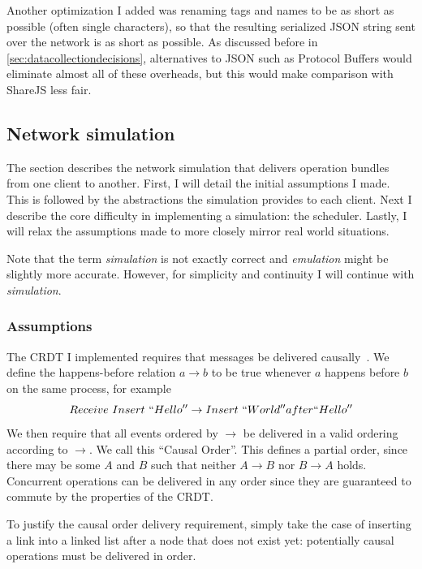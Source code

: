 \documentclass[12pt,a4paper,twoside,openright]{report}
\begin{document}
			Another optimization I added was renaming tags and names to be as short as possible (often single characters), so that the resulting serialized JSON string sent over the network is as short as possible. As discussed before in \cref{sec:datacollectiondecisions}, alternatives to JSON such as Protocol Buffers would eliminate almost all of these overheads, but this would make comparison with ShareJS less fair.
	
	\subsection{Network simulation}

	
		The section describes the network simulation that delivers operation bundles from one client to another. First, I will detail the initial assumptions I made. This is followed by the abstractions the simulation provides to each client. Next I describe the core difficulty in implementing a simulation: the scheduler. Lastly, I will relax the assumptions made to more closely mirror real world situations.
		
		Note that the term \textit{simulation} is not exactly correct and \textit{emulation} might be slightly more accurate. However, for simplicity and continuity I will continue with \textit{simulation}.
		
		\subsubsection{Assumptions} \label{sec:networkassumptions}
		The CRDT I implemented requires that messages be delivered causally~\cite{concdistsystems}. We define the happens-before relation \(a \rightarrow b\) to be true whenever $a$ happens before $b$ on the same process, for example \[Receive\ Insert\ ``Hello'' \rightarrow Insert\ `` World'' after ``Hello''\]
		We then require that all events ordered by $\rightarrow$ be delivered in a valid ordering according to $\rightarrow$. We call this ``Causal Order''. This defines a partial order, since there may be some $A$ and $B$ such that neither $A \rightarrow B$ nor $B \rightarrow A$ holds. Concurrent operations can be delivered in any order since they are guaranteed to commute by the properties of the CRDT.
		
		To justify the causal order delivery requirement, simply take the case of inserting a link into a linked list after a node that does not exist yet: potentially causal operations must be delivered in order. 
		
\end{document}

